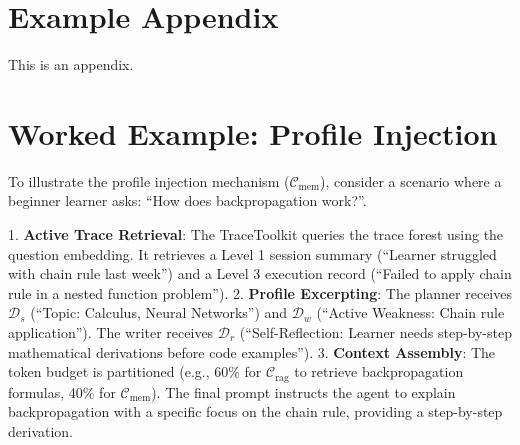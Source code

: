\section{Example Appendix}
\label{sec:appendix}

This is an appendix.

\section{Worked Example: Profile Injection}
\label{sec:appendix_worked_example}

To illustrate the profile injection mechanism ($\mathcal{C}_{\text{mem}}$), consider a scenario where a beginner learner asks: ``How does backpropagation work?''.

1. \textbf{Active Trace Retrieval}: The TraceToolkit queries the trace forest using the question embedding. It retrieves a Level 1 session summary (``Learner struggled with chain rule last week'') and a Level 3 execution record (``Failed to apply chain rule in a nested function problem'').
2. \textbf{Profile Excerpting}: The planner receives $\mathcal{D}_s$ (``Topic: Calculus, Neural Networks'') and $\mathcal{D}_w$ (``Active Weakness: Chain rule application''). The writer receives $\mathcal{D}_r$ (``Self-Reflection: Learner needs step-by-step mathematical derivations before code examples'').
3. \textbf{Context Assembly}: The token budget is partitioned (e.g., 60\% for $\mathcal{C}_{\text{rag}}$ to retrieve backpropagation formulas, 40\% for $\mathcal{C}_{\text{mem}}$). The final prompt instructs the agent to explain backpropagation with a specific focus on the chain rule, providing a step-by-step derivation.
